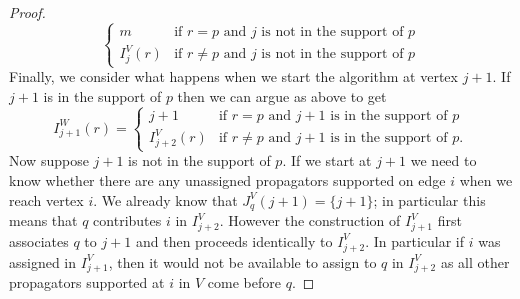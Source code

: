 \documentclass[11pt]{article}
\theoremstyle{remark}
\theoremstyle{definition}
\begin{document}
\begin{proof}
\[\begin{cases}
       m & \text{if $r =p$ and $j$ is not in the support of $p$} \\
       I_{j}^{V}(r) & \text{if $r\neq p$ and $j$ is not in the support of $p$}\end{cases}
       \] 
Finally, we consider what happens when we start the algorithm at vertex $j+1$. If $j+1$ is in the support of $p$ then we can argue as above to get
\[
       I_{j+1}^{W}(r)  = \begin{cases}
         j+1 & \text{if $r=p$ and $j+1$ is in the support of $p$}\\
         I_{j+2}^{V}(r) & \text{if $r\neq p$ and $j+1$ is in the support of $p$}.
       \end{cases}
       \]
Now suppose $j+1$ is not in the support of $p$. If we start at $j+1$ we need to know whether there are any unassigned propagators supported on edge $i$ when we reach vertex $i$. We already know that $J_q^{V}(j+1) = \{j+1\}$; in particular this means that $q$ contributes $i$ in $I_{j+2}^{V}$.  However the construction of $I^{V}_{j+1}$ first associates $q$ to $j+1$ and then proceeds identically to $I^{V}_{j+2}$.  In particular if $i$ was assigned in $I^{V}_{j+1}$, then it would not be available to assign to $q$ in $I^{V}_{j+2}$ as all other propagators supported at $i$ in $V$ come before $q$. 


\end{proof}
\end{document}
